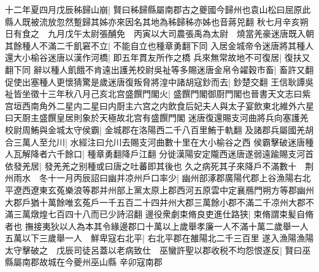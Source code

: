 十二年夏四月戊辰秭歸山崩|{
	賢曰秭歸縣屬南郡古之夔國今歸州也袁山松曰屈原此縣人既被流放忽然蹔歸其姊亦來因名其地為秭歸秭亦姊也音蔣兕翻}
秋七月辛亥朔日有食之　九月戊午太尉張酺免　丙寅以大司農張禹為太尉　燒當羌豪迷唐既入朝其餘種人不滿二千飢窘不立|{
	不能自立也種章勇翻下同}
入居金城帝令迷唐將其種人還大小榆谷迷唐以漢作河橋|{
	即五年貫友所作之橋}
兵來無常故地不可復居|{
	復扶又翻下同}
辭以種人飢餓不肯遠出護羌校尉吳祉等多賜迷唐金帛令糴穀市畜|{
	畜許又翻}
促使出塞種人更懷猜驚是歲迷唐復叛脅將湟中諸胡寇鈔而去|{
	鈔楚交翻}
王信耿譚吳祉皆坐徵十三年秋八月己亥北宫盛饌門閣火|{
	盛饌門閣御㕑門閣也晉書天文志曰紫宫垣西南角外二星内二星曰内㕑主六宫之内飲食后妃夫人與太子宴飲東北維外六星曰天㕑主盛饌皇居則象於天極故北宫有盛饌門閣}
迷唐復還賜支河曲將兵向塞護羌校尉周鮪與金城太守侯霸|{
	金城郡在洛陽西二千八百里鮪于軌翻}
及諸郡兵屬國羌胡合三萬人至允川|{
	水經注曰允川去賜支河曲數十里在大小榆谷之西}
侯霸擊破迷唐種人瓦解降者六千餘口|{
	種章勇翻降戶江翻}
分徙漢陽安定隴西迷唐遂弱遠踰賜支河首依發羌居|{
	發羌羌之别種或曰唐之吐蕃即其後也}
久之病死其子來降戶不滿數十　荆州雨水　冬十一月丙辰詔曰幽并凉州戶口率少|{
	幽州部涿郡廣陽代郡上谷漁陽右北平遼西遼東玄菟樂浪等郡并州部上黨太原上郡西河五原雲中定襄鴈門朔方等郡幽州大郡戶猶十萬餘唯玄菟戶一千五百二十四并州大郡三萬餘小郡不滿二千凉州大郡不滿三萬燉煌七百四十八而已少詩沼翻}
邊役衆劇束脩良吏進仕路狭|{
	束脩謂束髪自脩者也}
撫接夷狄以人為本其令緣邊郡口十萬以上歲舉孝廉一人不滿十萬二歲舉一人五萬以下三歲舉一人　鮮卑寇右北平|{
	右北平郡在雒陽北二千三百里}
遂入漁陽漁陽太守擊破之　戊辰司徒呂蓋以老病致仕　巫蠻許聖以郡收税不均怨恨遂反|{
	賢曰巫縣屬南郡故城在今夔州巫山縣}
辛卯寇南郡

